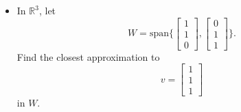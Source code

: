 \documentclass[11pt]{article}
\begin{document}
    \begin{itemize}
        \item In \(\mathbb{R}^3\), let \[W = \text{span}\{ \begin{bmatrix}
            1 \\ 1 \\ 0
        \end{bmatrix}, \begin{bmatrix}
            0 \\ 1 \\ 1
        \end{bmatrix}\}.\] Find the closest approximation to \[v = \begin{bmatrix}
            1 \\ 1 \\ 1
        \end{bmatrix}\] in $W$.
    

\end{itemize}
\end{document}
